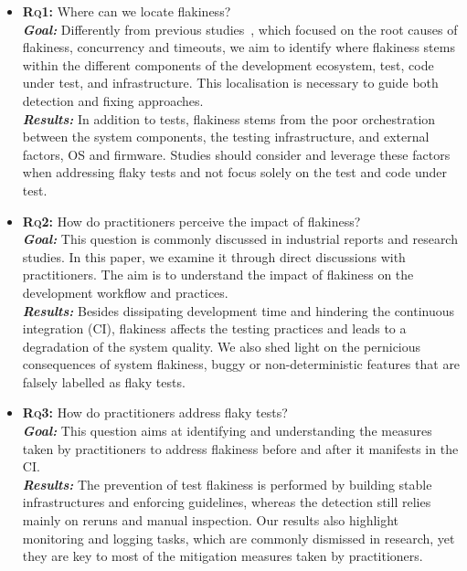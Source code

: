 \begin{itemize}[wide=10pt,noitemsep,topsep=0pt]
    \item \textbf{\textsc{Rq1:}} Where can we locate flakiness?\\
    \textit{\textbf{Goal:}} Differently from previous studies~\cite{luo_empirical_2014,eck_understanding_2019,Thorve2018,dutta_detecting_2020,Lam2019RootCausing}, which focused on the root causes of flakiness, \eg concurrency and timeouts, we aim to identify where flakiness stems within the different components of the development ecosystem, \eg test, code under test, and infrastructure. This localisation is necessary to guide both detection and fixing approaches.\\
    \textit{\textbf{Results:}} In addition to tests, flakiness stems from the poor orchestration between the system components, the testing infrastructure, and external factors, \eg OS and firmware. Studies should consider and leverage these factors when addressing flaky tests and not focus solely on the test and code under test.
    
    \item \textbf{\textsc{Rq2:}} How do practitioners perceive the impact of flakiness?\\
    \textit{\textbf{Goal:}} This question is commonly discussed in industrial reports and research studies. In this paper, 
    we examine it through direct discussions with practitioners. The aim is to understand the impact of flakiness on the development workflow and practices. \\
    \textit{\textbf{Results:}} Besides dissipating development time and hindering the continuous integration (CI), flakiness affects the testing practices and leads to a degradation of the system quality. We also shed light on the pernicious consequences of system flakiness, \ie buggy or non-deterministic features that are falsely labelled as flaky tests.
    
    \item \textbf{\textsc{Rq3:}} How do practitioners address flaky tests?\\
    \textit{\textbf{Goal:}} This question aims at identifying and understanding the measures taken by practitioners to address flakiness before and after it manifests in the CI.\\
    \textit{\textbf{Results:}} 
    The prevention of test flakiness is performed by building stable infrastructures and enforcing guidelines, whereas the detection still relies mainly on reruns and manual inspection. Our results also highlight monitoring and logging tasks, which are commonly dismissed in research, yet they are key to most of the mitigation measures taken by practitioners.
    

\end{itemize}
